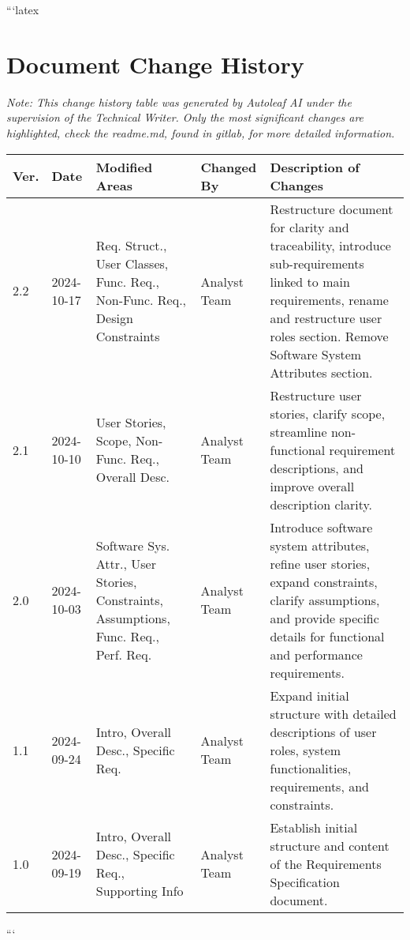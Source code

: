 ```latex
\section{Document Change History}

\begin{center}
\small\textit{Note: This change history table was generated by Autoleaf AI under the supervision of the Technical Writer. Only the most significant changes are highlighted, check the readme.md, found in gitlab, for more detailed information.}

\vspace{0.5cm}

\begin{tabular}{|p{}|p{}|p{}|p{}|p{}|}
\hline
\textbf{Ver.} & \textbf{Date} & \textbf{Modified Areas} & \textbf{Changed By} & \textbf{Description of Changes} \\
\hline
2.2 & 2024-10-17 & Req. Struct., User Classes, Func. Req., Non-Func. Req., Design Constraints & Analyst Team & Restructure document for clarity and traceability, introduce sub-requirements linked to main requirements, rename and restructure user roles section. Remove Software System Attributes section. \\
\hline
2.1 & 2024-10-10 & User Stories, Scope, Non-Func. Req., Overall Desc. & Analyst Team & Restructure user stories, clarify scope, streamline non-functional requirement descriptions, and improve overall description clarity. \\
\hline
2.0 & 2024-10-03 & Software Sys. Attr., User Stories, Constraints, Assumptions, Func. Req., Perf. Req. & Analyst Team & Introduce software system attributes, refine user stories, expand constraints, clarify assumptions, and provide specific details for functional and performance requirements. \\
\hline
1.1 & 2024-09-24 & Intro, Overall Desc., Specific Req. & Analyst Team & Expand initial structure with detailed descriptions of user roles, system functionalities, requirements, and constraints. \\
\hline
1.0 & 2024-09-19 & Intro, Overall Desc., Specific Req., Supporting Info & Analyst Team & Establish initial structure and content of the Requirements Specification document. \\
\hline
\end{tabular}
\end{center}

\vspace{1cm}
```
